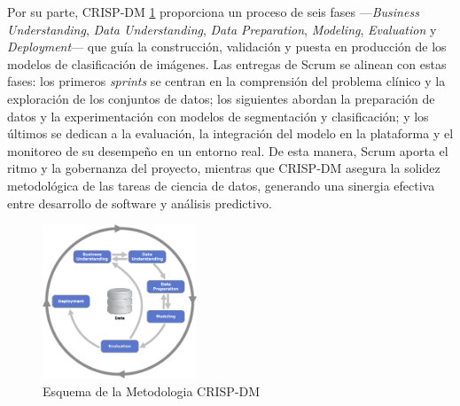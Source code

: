 Por su parte, CRISP‑DM \ref{fig:crisp} proporciona un proceso de seis fases —\emph{Business Understanding}, \emph{Data Understanding}, \emph{Data Preparation}, \emph{Modeling}, \emph{Evaluation} y \emph{Deployment}— que guía la construcción, validación y puesta en producción de los modelos de clasificación de imágenes. Las entregas de Scrum se alinean con estas fases: los primeros \emph{sprints} se centran en la comprensión del problema clínico y la exploración de los conjuntos de datos; los siguientes abordan la preparación de datos y la experimentación con modelos de segmentación y clasificación; y los últimos se dedican a la evaluación, la integración del modelo en la plataforma y el monitoreo de su desempeño en un entorno real. De esta manera, Scrum aporta el ritmo y la gobernanza del proyecto, mientras que CRISP‑DM asegura la solidez metodológica de las tareas de ciencia de datos, generando una sinergia efectiva entre desarrollo de software y análisis predictivo.


\begin{figure}[H] %
    \centering
    \includegraphics[width=0.41\textwidth]{imagenes/800px-CRISP-DM_Process_Diagram (1).png}
    \caption{Esquema de la Metodologia CRISP-DM}
    \label{fig:crisp}
\end{figure}



